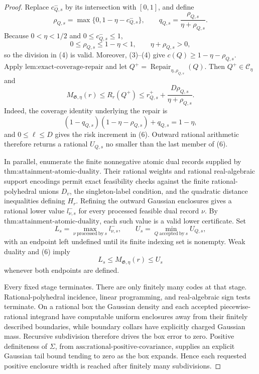 \documentclass{article}
\begin{document}
\begin{proof}
Replace \(c^-_{Q,s}\) by its intersection with \([0,1]\), and define
\[
 \rho_{Q,s}=\max\{0,1-\eta-c^-_{Q,s}\},
 \qquad
 q_{Q,s}=\frac{\rho_{Q,s}}{\eta+\rho_{Q,s}}.
 \tag{4}
\]
Because \(0<\eta<1/2\) and \(0\le c^-_{Q,s}\le1\),
\[
 0\le\rho_{Q,s}\le1-\eta<1,
 \qquad \eta+\rho_{Q,s}>0,
 \tag{5}
\]
so the division in (4) is valid.  Moreover, (3)--(4) give \(c(Q)\ge1-\eta-\rho_{Q,s}\).  Apply \(\text{lem:exact-coverage-repair}\) and let \(Q^+=\operatorname{Repair}_{\eta,\rho_{Q,s}}(Q)\).  Then \(Q^+\in\mathcal C_\eta\) and
\[
 M_{\mathfrak G,\eta}(r)
 \le R_r(Q^+)
 \le r^+_{Q,s}+\frac{D\rho_{Q,s}}{\eta+\rho_{Q,s}}.
 \tag{6}
\]
Indeed, the coverage identity underlying the repair is
\[
 \left(1-q_{Q,s}\right)(1-\eta-\rho_{Q,s})+q_{Q,s}=1-\eta,
 \tag{7}
\]
and \(0\le\ell\le D\) gives the risk increment in (6).  Outward rational arithmetic therefore returns a rational \(U_{Q,s}\) no smaller than the last member of (6).

In parallel, enumerate the finite nonnegative atomic dual records supplied by \(\text{thm:attainment-atomic-duality}\).  Their rational weights and rational real-algebraic support encodings permit exact feasibility checks against the finite rational-polyhedral unions \(D_v\), the singleton-label condition, and the quadratic distance inequalities defining \(H_r\).  Refining the outward Gaussian enclosures gives a rational lower value \(l^-_{\nu,s}\) for every processed feasible dual record \(\nu\).  By \(\text{thm:attainment-atomic-duality}\), each such value is a valid lower certificate.  Set
\[
 L_s=\max_{\nu\ \mathrm{processed\ by}\ s}l^-_{\nu,s},
 \qquad
 U_s=\min_{Q\ \mathrm{accepted\ by}\ s}U_{Q,s},
 \tag{8}
\]
with an endpoint left undefined until its finite indexing set is nonempty.  Weak duality and (6) imply
\[
 L_s\le M_{\mathfrak G,\eta}(r)\le U_s
 \tag{9}
\]
whenever both endpoints are defined.

Every fixed stage terminates.  There are only finitely many codes at that stage.  Rational-polyhedral incidence, linear programming, and real-algebraic sign tests terminate.  On a rational box the Gaussian density and each accepted piecewise-rational integrand have computable uniform enclosures away from their finitely described boundaries, while boundary collars have explicitly charged Gaussian mass.  Recursive subdivision therefore drives the box error to zero.  Positive definiteness of \(\Sigma\), from \(\text{ass:rational-positive-covariance}\), supplies an explicit Gaussian tail bound tending to zero as the box expands.  Hence each requested positive enclosure width is reached after finitely many subdivisions.


\end{proof}
\end{document}
